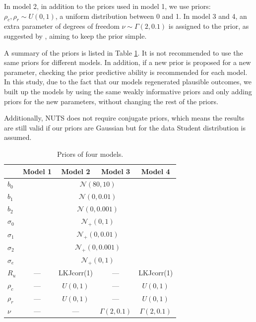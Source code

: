 \documentclass[a4paper]{article}   	%
\newcommand{\N}{\mathcal{N}}
\begin{document}
	
	
	In model 2, in addition to the priors used in model 1, we use priors: $\rho_c,\rho_r\sim U(0,1)$, a uniform distribution between 0 and 1. In model 3 and 4, an extra parameter of degrees of freedom $\nu\sim \Gamma(2,0.1)$ is assigned to the prior, as suggested by \textcite{Juarez2010ModelBased}, aiming to keep the prior simple. 
	
	A summary of the priors is listed in Table \ref{tb:priors}. It is not recommended to use the same priors for different models. In addition, if a new prior is proposed for a new parameter, checking the prior predictive ability is recommended for each model. In this study, due to the fact that our models regenerated plausible outcomes, we built up the models by using the same weakly informative priors and only adding priors for the new parameters, without changing the rest of the priors.
	
	
	Additionally, NUTS does not require conjugate priors, which means the results are still valid if our priors are Gaussian but for the data Student distribution is assumed. 
	
	
	\begin{table}[!htp]
		\centering
		\begin{tabular}{l *{4}{c}} \toprule
			& Model 1 & Model 2& Model 3& Model 4  \\ \midrule
			$b_0$ & \multicolumn{4}{c}{$\N(80, 10)$} \\ 
			$b_1$ & \multicolumn{4}{c}{$\N(0, 0.01)$} \\ 
			$b_2$ & \multicolumn{4}{c}{$\N(0, 0.001)$} \\ 
			$\sigma_0$ & \multicolumn{4}{c}{$\N_+(0, 1)$} \\ 
			$\sigma_1$ & \multicolumn{4}{c}{$\N_+(0, 0.01)$} \\
			$\sigma_2$ & \multicolumn{4}{c}{$\N_+(0, 0.001)$} \\ 
			$\sigma_e$ & \multicolumn{4}{c}{$\N_+(0, 1)$} \\ \midrule
			$R_u$ & --- & LKJcorr(1) & --- & LKJcorr(1) \\ 
			$\rho_c$ & --- & $U(0,1)$ & --- & $U(0,1)$ \\ 
			$\rho_r$ & --- & $U(0,1)$ & --- &  $U(0,1)$ \\ 		
			$\nu$ & --- &  --- & $\Gamma(2,0.1)$ & $\Gamma(2,0.1)$ \\ 
			\bottomrule
		\end{tabular}\caption{Priors of four models.}\label{tb:priors}
	\end{table}
	
\end{document}
